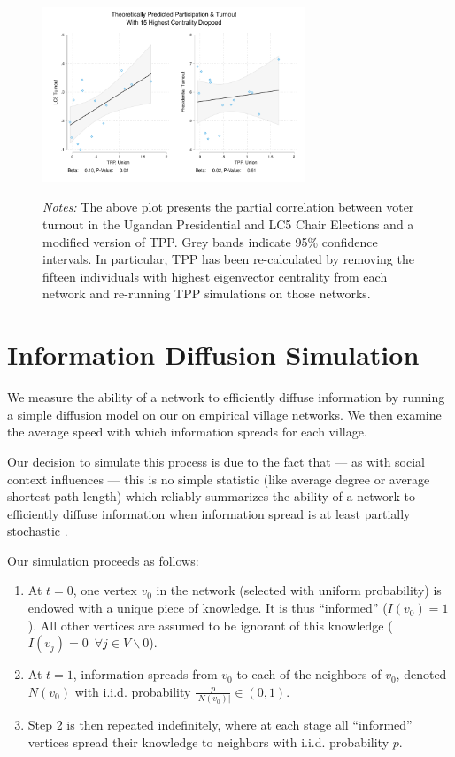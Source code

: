 \documentclass[12pt]{article}
\begin{document}
\begin{appendix}
\begin{figure}[hb!]
  \begin{center}
    \caption{}\label{figure_context_voting_scatter_drop15}
      \includegraphics[width=0.7\textwidth]{../3_results/context_voting_scatter_drop15.pdf}
  \end{center}
	\scriptsize{\emph{Notes:}  The above plot presents the partial correlation between voter turnout in the Ugandan Presidential and LC5 Chair Elections and a modified version of TPP.  Grey bands indicate 95\% confidence intervals. In particular, TPP has been re-calculated by removing the fifteen individuals with highest eigenvector centrality from each network and re-running TPP simulations on those networks.}
\end{figure}

\pagebreak
\section{Information Diffusion Simulation}\label{appendix_diffusion_model}
We measure the ability of a network to efficiently diffuse information by running a simple diffusion model on our on empirical village networks. We then examine the average speed with which information spreads for each village.

Our decision to simulate this process is due to the fact that --- as with social context influences --- this is no simple statistic (like average degree or average shortest path length) which reliably summarizes the ability of a network to efficiently diffuse information when information spread is at least partially stochastic \citep[p. 19-35]{Newman:jyb}.

Our simulation proceeds as follows:
\begin{enumerate}
	\item At $t=0$, one vertex $v_0$ in the network (selected with uniform probability) is endowed with a unique piece of knowledge. It is thus ``informed'' ($I(v_0) = 1$). All other vertices are assumed to be ignorant of this knowledge ($I(v_j) = 0 \,\,\, \forall j\in V\backslash 0$).
	\item At $t=1$, information spreads from $v_0$ to each of the neighbors of $v_0$, denoted $N(v_0)$ with i.i.d. probability $\frac{p}{|N(v_0)|} \in(0,1)$.
	\item Step 2 is then repeated indefinitely, where at each stage all ``informed'' vertices spread their knowledge to neighbors with i.i.d. probability $p$.
\end{enumerate}


\end{appendix}
\end{document}

